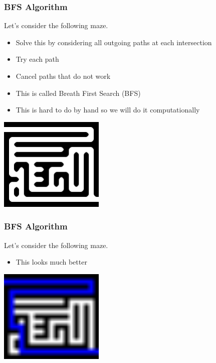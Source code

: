\documentclass{beamer}
\begin{document}
            \begin{frame}
                \frametitle{BFS Algorithm}
                Let's consider the following maze.
                \begin{itemize}
                    \item Solve this by considering all outgoing paths at each intersection
                    \item Try each path
                    \item Cancel paths that do not work
                    \item This is called Breath First Search (BFS)
                    \item This is hard to do by hand so we will do it computationally
    
                \end{itemize}
                \includegraphics[width=5cm]{figures/maze_bfs_lg.png}

            
                
                \end{frame}
    


            \begin{frame}
                \frametitle{BFS Algorithm}
                Let's consider the following maze.
                \begin{itemize}
                    \item This looks much better
    
                \end{itemize}

                \includegraphics[width=5cm,scale=2]{../bfs_out.png}
            
                
                \end{frame}
\end{document}
